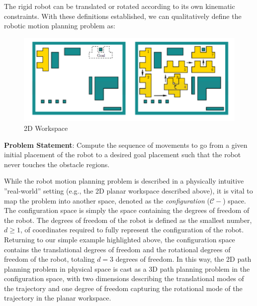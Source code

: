\documentclass[twoside]{article}
\begin{document}
The rigid robot can be translated or rotated according to its own kinematic constraints. With these definitions established, we can qualitatively define the robotic motion planning problem as:

\begin{figure}[ht!]
\begin{center}
\includegraphics{fig15_1.PNG}
\caption{2D Workspace}
\end{center}
\end{figure}

\textbf{Problem Statement}: Compute the sequence of movements to go from a given initial placement of the robot to a desired goal placement such that the robot never touches the obstacle regions.

While the robot motion planning problem is described in a physically intuitive ”real-world” setting (e.g., the 2D planar workspace described above), it is vital to map the problem into another space, denoted as the \textit{configuration} ($\mathcal{C-}$) space. The configuration space is simply the space containing the degrees of freedom of the robot. The degrees of freedom of the robot is defined as the smallest number, $d \geq 1$, of coordinates required to fully represent the configuration of the robot. Returning to our simple example highlighted above, the configuration space contains the translational degrees of freedom and the rotational degrees of freedom of the robot, totaling $d=3$ degrees of freedom. In this way, the 2D path planning problem in physical space is cast as a 3D path planning problem in the configuration space, with two dimensions describing the translational modes of the trajectory and one degree of freedom capturing the rotational mode of the trajectory in the planar workspace.
 
\end{document}
